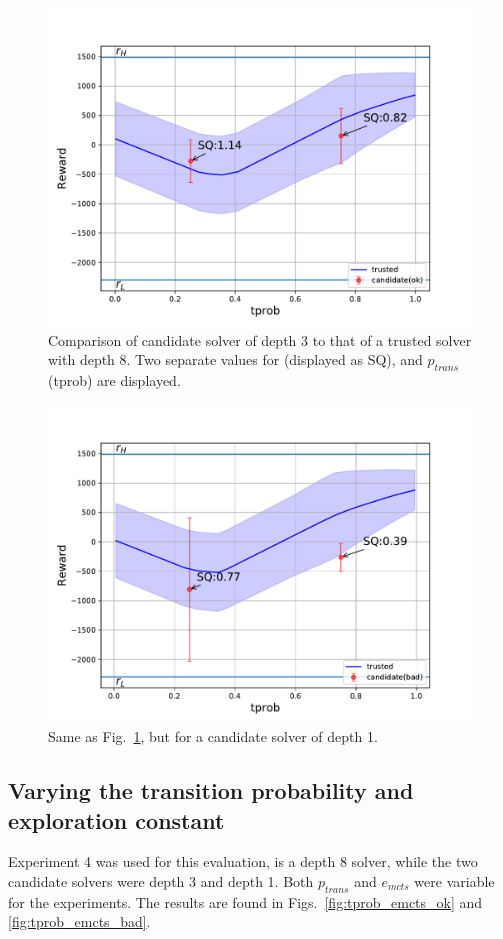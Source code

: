 \begin{figure}[tbp]
    \centering
    \includegraphics[width=0.9\linewidth]{Figures/transition_vary_tprob_ok.pdf}
    \caption{Comparison of candidate solver of depth 3 to that of a trusted solver with depth 8. Two separate values for \xQ{} (displayed as SQ), and $p_{trans}$ (tprob) are displayed.}
    \label{fig:tprob_ok}
\end{figure}
\begin{figure}[tbp]
    \centering
    \includegraphics[width=0.9\linewidth]{Figures/transition_vary_tprob_bad.pdf}
    \caption{Same as Fig.~\ref{fig:tprob_ok}, but for a candidate solver of depth 1.}
    \label{fig:tprob_bad}
\end{figure}

\subsection{Varying the transition probability and exploration constant}
Experiment 4 was used for this evaluation, \solverstar{} is a depth 8 solver, while the two candidate solvers were depth 3 and depth 1. Both $p_{trans}$ and $e_{mcts}$ were variable for the experiments. The results are found in Figs.~\ref{fig:tprob_emcts_ok} and \ref{fig:tprob_emcts_bad}.

